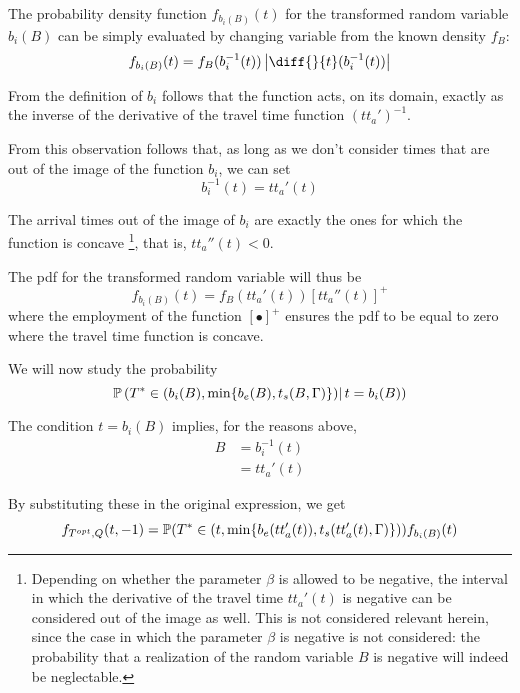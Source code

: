 The probability density function \(f_{b_i(B)}(t)\) for the transformed random variable \(b_i(B)\) can be simply evaluated by changing variable from the known density \(f_B\):
\begin{equation}
  \label{eq:pdf-b-change-var}
  f_{b_i(B)}(t) = f_B(b_i^{-1}(t)) \left| \diff{}{t}(b_i^{-1}(t)) \right|
\end{equation}

From the definition of \(b_i\) follows that the function acts,
on its domain, exactly as the inverse of the derivative of the travel time function \((tt_a')^{-1}\).

From this observation follows that, as long as we don't consider times that are out of the image of the function \(b_i\),
we can set
\begin{equation*}
  b_i^{-1}(t) = tt_a'(t)
\end{equation*}

The arrival times out of the image of \(b_i\) are exactly the ones for which the function is concave
\footnote{
  Depending on whether the parameter \(\beta\) is allowed to be negative,
  the interval in which the derivative of the travel time \(tt_a'(t)\) is negative can be considered out of the image as well.
  This is not considered relevant herein,
  since the case in which the parameter \(\beta\) is negative is not considered:
  the probability that a realization of the random variable \(B\) is negative will indeed be neglectable.
},
that is, \(tt_a''(t) < 0\).

The pdf for the transformed random variable will thus be
\begin{equation}
  \label{eq:pdf-b-changed-var}
  f_{b_i(B)}(t) = f_B(tt_a'(t)) [tt_a''(t)]^+
\end{equation}
where the employment of the function \([\bullet]^+\) ensures the pdf to be equal to zero where the travel time function is concave.

We will now study the probability
\begin{equation*}
  \mathbb{P}\left(T^* \in (b_i(B), \min\{b_e(B), t_s(B, \Gamma)\})|\, t = b_i(B)\right)
\end{equation*}

The condition \(t = b_i(B)\) implies, for the reasons above,
\begin{align*}
  B & = b_i^{-1}(t) \\
    & = tt_a'(t)
\end{align*}

By substituting these in the original expression, we get
\begin{equation}
  \label{eq:early-subst}
  f_{T^{opt}, Q}(t, -1) = \mathbb{P}(T^* \in (t, \min\{b_e(tt_a'(t)), t_s(tt_a'(t), \Gamma)\}))f_{b_i(B)}(t)
\end{equation}

